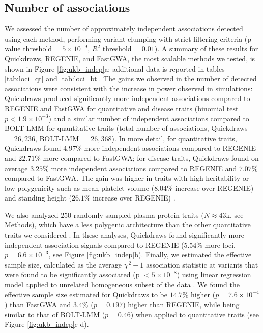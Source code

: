 \clearpage

\subsection{Number of associations}
We assessed the number of approximately independent associations detected using each method, performing variant clumping with strict filtering criteria (p-value threshold = $5 \times 10^{-9}$, $R^2$ threshold = $0.01$).
%
A summary of these results for Quickdraws, REGENIE, and FastGWA, the most scalable methods we tested, is shown in Figure \ref{fig:ukb_indep}a; additional data is reported in tables \ref{tab:loci_qt} and \ref{tab:loci_bt}. 
%
The gains we observed in the number of detected associations were consistent with the increase in power observed in simulations: Quickdraws produced significantly more independent associations compared to REGENIE and FastGWA for quantitative and disease traits (binomial test $p < 1.9 \times 10^{-3}$) and a similar number of independent associations compared to BOLT-LMM for quantitative traits (total number of associations, Quickdraws $=26{,}236$, BOLT-LMM $=26{,}368$).
%
In more detail, for quantitative traits, Quickdraws found $4.97\%$ more independent associations compared to REGENIE and $22.71\%$ more compared to FastGWA; for disease traits, Quickdraws found on average $3.25\%$ more independent associations compared to REGENIE and $7.07\%$ compared to FastGWA.
%
The gain was higher in traits with high heritability or low polygenicity such as mean platelet volume ($8.04\%$ increase over REGENIE) and standing height ($26.1\%$ increase over REGENIE) \cite{zeng2021widespread}.
%

%
We also analyzed $250$ randomly sampled plasma-protein traits ($N \approx 43$k, see Methods), which have a less polygenic architecture than the other quantitative traits we considered \cite{sun2023plasma}.
%
In these analyses, Quickdraws found significantly more independent association signals compared to REGENIE (5.54\% more loci, $p = 6.6 \times 10^{-3}$, see Figure \ref{fig:ukb_indep}b).
%
Finally, we estimated the effective sample size, calculated as the average $\chi^2 - 1$ association statistic at variants that were found to be significantly associated (p $<5 \times 10^{-8}$) using linear regression model applied to unrelated homogeneous subset of the data \cite{yang2011genomic}.
%
We found the effective sample size estimated for Quickdraws to be $14.7\%$ higher ($p = 7.6 \times 10^{-4}$) than FastGWA and $3.4\%$ ($p = 0.197$) higher than REGENIE, while being similar to that of BOLT-LMM ($p = 0.46$) when applied to quantitative traits (see Figure \ref{fig:ukb_indep}c-d).
%

